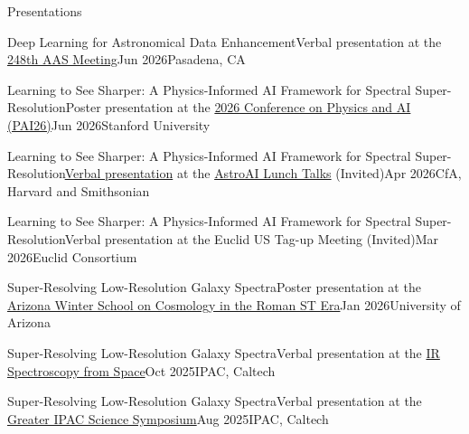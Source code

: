 \documentclass[]{kyvernitis-resume}
\begin{document}
\begin{section}{Presentations}
\begin{subsectionnobullet}{Deep Learning for Astronomical Data Enhancement}{Verbal presentation at the \href{https://aas.org/meetings/aas248}{248th AAS Meeting}}{Jun 2026}{Pasadena, CA}
\end{subsectionnobullet}

\begin{subsectionnobullet}{Learning to See Sharper: A Physics-Informed AI Framework for Spectral Super-Resolution}{Poster presentation at the \href{https://datascience.stanford.edu/events/center-decoding-universe/c4du-annual-conference/2026-conference-physics-and-ai-pai26}{2026 Conference on Physics and AI (PAI26)}}{Jun 2026}{Stanford University}
\end{subsectionnobullet}

\begin{subsectionnobullet}{Learning to See Sharper: A Physics-Informed AI Framework for Spectral Super-Resolution}{\href{https://www.youtube.com/watch?v=M9KbXy-63ls\&t=1778s}{Verbal presentation} at the \href{https://astroai.cfa.harvard.edu/lunch_talks/}{AstroAI Lunch Talks} (Invited)}{Apr 2026}{CfA, Harvard and Smithsonian}
\end{subsectionnobullet}

\begin{subsectionnobullet}{Learning to See Sharper: A Physics-Informed AI Framework for Spectral Super-Resolution}{Verbal presentation at the Euclid US Tag-up Meeting (Invited)}{Mar 2026}{Euclid Consortium}
\end{subsectionnobullet}

\begin{subsectionnobullet}{Super-Resolving Low-Resolution Galaxy Spectra}{Poster presentation at the \href{https://tap.arizona.edu/news/arizona-winter-school-multi-probe-cosmology-roman-st-era}{Arizona Winter School on Cosmology in the Roman ST Era}}{Jan 2026}{University of Arizona}
\end{subsectionnobullet}

\begin{subsectionnobullet}{Super-Resolving Low-Resolution Galaxy Spectra}{Verbal presentation at the \href{https://conference.ipac.caltech.edu/IRSpaceSpectroscopy}{IR Spectroscopy from Space}}{Oct 2025}{IPAC, Caltech}
\end{subsectionnobullet}

\begin{subsectionnobullet}{Super-Resolving Low-Resolution Galaxy Spectra}{Verbal presentation at the \href{https://conference.ipac.caltech.edu/giss2025/}{Greater IPAC Science Symposium}}{Aug 2025}{IPAC, Caltech}
\end{subsectionnobullet}


\end{section}
\end{document}
